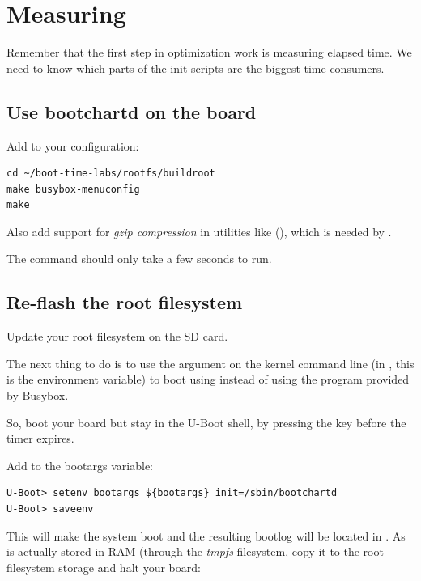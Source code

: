 
\section{Measuring}

Remember that the first step in optimization work is measuring elapsed
time. We need to know which parts of the init scripts are the biggest
time consumers.

\subsection{Use bootchartd on the board}

Add  to your  configuration:

\begin{verbatim}
cd ~/boot-time-labs/rootfs/buildroot
make busybox-menuconfig
make
\end{verbatim}

Also add support for {\em gzip compression} in utilities like 
(), which is needed by .

The  command should only take a few seconds to run.

\subsection{Re-flash the root filesystem}

Update your root filesystem on the SD card.

The next thing to do is to use the  argument on the
kernel command line (in , this is the 
environment variable) to boot using  instead of using
the  program provided by Busybox.

So, boot your board but stay in the U-Boot shell, by pressing the
 key before the timer expires.

Add  to the bootargs variable:
\begin{verbatim}
U-Boot> setenv bootargs ${bootargs} init=/sbin/bootchartd
U-Boot> saveenv
\end{verbatim}

This will make the system boot and the resulting bootlog will be located
in . As  is actually stored in
RAM (through the {\em tmpfs} filesystem, copy it to the root filesystem
storage and halt your board:

